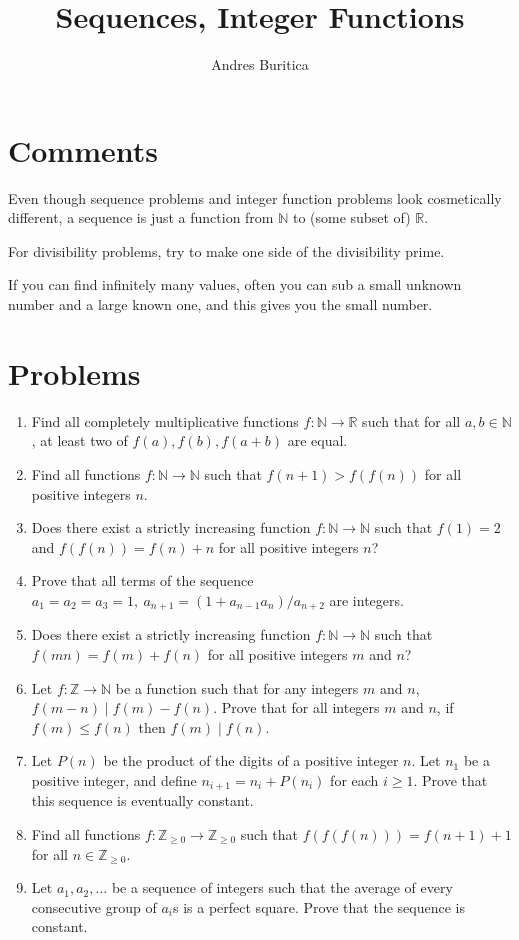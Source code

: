 \documentclass{article}
\title{Sequences, Integer Functions}
\author{Andres Buritica}
\date{}
\newcommand\Nn{\mathbb{N}}
\newcommand\Zz{\mathbb{Z}}
\newcommand\Rr{\mathbb{R}}
\begin{document}
\maketitle
\section{Comments}
Even though sequence problems and integer function problems look cosmetically
different, a sequence is just a function from $\Nn$ to (some subset of) $\Rr$.

For divisibility problems, try to make one side of the divisibility prime.

If you can find infinitely many values, often you can sub a small unknown number
and a large known one, and this gives you the small number.
\section{Problems}
\begin{enumerate}
  \item Find all completely multiplicative functions $f:\mathbb N\to\mathbb R$
    such that for all $a,b\in\mathbb N$, at least two of $f(a),f(b),f(a+b)$ are
    equal.
  \item Find all functions $f:\Nn\to\Nn$ such that $f(n+1)>f(f(n))$ for all
    positive integers $n$.
  \item Does there exist a strictly increasing function $f:\Nn\to\Nn$ such that
    $f(1)=2$ and $f(f(n))=f(n)+n$ for all positive integers $n$?
  \item Prove that all terms of the sequence $a_1=a_2=a_3=1,\
    a_{n+1}=(1+a_{n-1}a_n)/a_{n+2}$ are integers.
  \item Does there exist a strictly increasing function $f:\Nn\to\Nn$ such that
    $f(mn)=f(m)+f(n)$ for all positive integers $m$ and $n$?
  \item Let $f:\Zz\to\Nn$ be a function such that for any integers $m$ and $n$,
    $f(m-n)\mid f(m)-f(n)$. Prove that for all integers $m$ and $n$, if $f(m)\le
    f(n)$ then $f(m)\mid f(n)$.
  \item Let $P(n)$ be the product of the digits of a positive integer $n$.
    Let $n_1$ be a positive integer, and define $n_{i+1}=n_i+P(n_i)$ for each
    $i\ge 1$. Prove that this sequence is eventually constant.
  \item Find all functions $f:\Zz_{\ge 0}\to \Zz_{\ge 0}$ such that
    $f(f(f(n)))=f(n+1)+1$ for all $n\in\Zz_{\ge 0}$.
  \item Let $a_1,a_2,\ldots$ be a sequence of integers such that the average of
    every consecutive group of $a_i$s is a perfect square. Prove that the
    sequence is constant.
\end{enumerate}
\newpage
\end{document}
